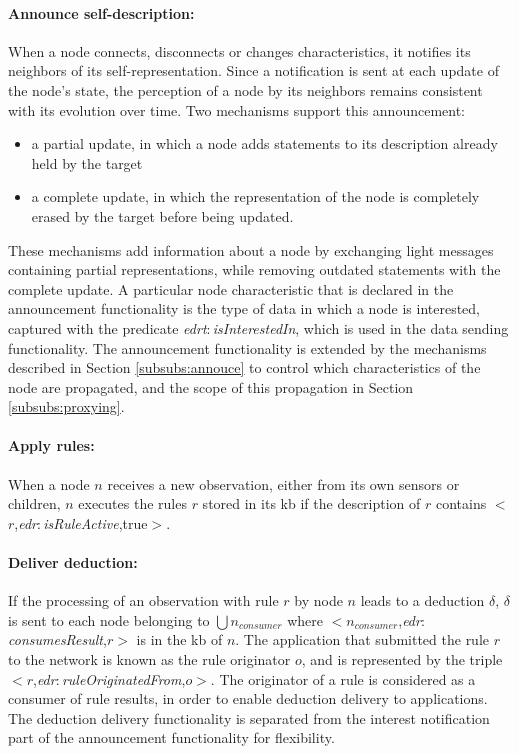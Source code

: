 \documentclass[sw]{iosart2x}
\newcommand{\namespace}[1]{\textit{#1$:$}}
\newcommand{\concept}[2]{\namespace{#1}\-\textit{#2}}
\newcommand{\triplet}[3]{$<$#1,\textit{#2},#3$>$}
\begin{document}
\paragraph{Announce self-description:}
When a node connects, disconnects or changes characteristics, it notifies its neighbors of its self-representation.
Since a notification is sent at each update of the node's state, the perception of a node by its neighbors remains consistent with its evolution over time.
Two mechanisms support this announcement: 
\begin{itemize}
	\item a partial update, in which a node adds statements to its description already held by the target
	\item a complete update, in which the representation of the node is completely erased by the target before being updated.
\end{itemize}
These mechanisms add information about a node by exchanging light messages containing partial representations, while removing outdated statements with the complete update. 
A particular node characteristic that is declared in the announcement functionality is the type of data in which a node is interested, captured with the predicate \concept{edrt}{is\-Interested\-In}, which is used in the data sending functionality.
The announcement functionality is extended by the mechanisms described in Section \textsection \ref{subsubs:annouce} to control which characteristics of the node are propagated, and the scope of this propagation in Section \textsection \ref{subsubs:proxying}.

\paragraph{Apply rules:}
When a node $n$ receives a new observation, either from its own sensors or children, $n$ executes the rules $r$ stored in its \gls{kb} if the description of $r$ contains \triplet{$r$}{\concept{edr}{is\-Rule\-Active}}{true}.

\paragraph{Deliver deduction:}
\label{par:deduction_delivery}
If the processing of an observation with rule $r$ by node $n$ leads to a deduction $\delta$, $\delta$ is sent to each node belonging to $\bigcup n_{consumer}$ where \triplet{$n_{consumer}$}{\concept{edr}{consumes\-Result}}{$r$} is in the \gls{kb} of $n$.
The application that submitted the rule $r$ to the network is known as the rule originator $o$, and is represented by the triple \triplet{$r$}{\concept{edr}{rule\-Originated\-From}}{$o$}.
The originator of a rule is considered as a consumer of rule results, in order to enable deduction delivery to applications.
The deduction delivery functionality is separated from the interest notification part of the announcement functionality for flexibility.
\end{document}
